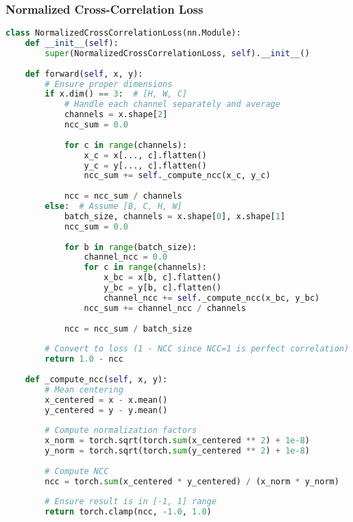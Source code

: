 \subsubsection{Normalized Cross-Correlation Loss}
\begin{lstlisting}[language=Python]
class NormalizedCrossCorrelationLoss(nn.Module):
    def __init__(self):
        super(NormalizedCrossCorrelationLoss, self).__init__()
        
    def forward(self, x, y):
        # Ensure proper dimensions
        if x.dim() == 3:  # [H, W, C]
            # Handle each channel separately and average
            channels = x.shape[2]
            ncc_sum = 0.0
            
            for c in range(channels):
                x_c = x[..., c].flatten()
                y_c = y[..., c].flatten()
                ncc_sum += self._compute_ncc(x_c, y_c)
                
            ncc = ncc_sum / channels
        else:  # Assume [B, C, H, W]
            batch_size, channels = x.shape[0], x.shape[1]
            ncc_sum = 0.0
            
            for b in range(batch_size):
                channel_ncc = 0.0
                for c in range(channels):
                    x_bc = x[b, c].flatten()
                    y_bc = y[b, c].flatten()
                    channel_ncc += self._compute_ncc(x_bc, y_bc)
                ncc_sum += channel_ncc / channels
                
            ncc = ncc_sum / batch_size
        
        # Convert to loss (1 - NCC since NCC=1 is perfect correlation)
        return 1.0 - ncc
    
    def _compute_ncc(self, x, y):
        # Mean centering
        x_centered = x - x.mean()
        y_centered = y - y.mean()
        
        # Compute normalization factors
        x_norm = torch.sqrt(torch.sum(x_centered ** 2) + 1e-8)
        y_norm = torch.sqrt(torch.sum(y_centered ** 2) + 1e-8)
        
        # Compute NCC
        ncc = torch.sum(x_centered * y_centered) / (x_norm * y_norm)
        
        # Ensure result is in [-1, 1] range
        return torch.clamp(ncc, -1.0, 1.0)
\end{lstlisting}

